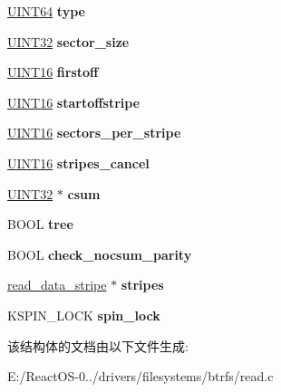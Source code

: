 \begin{DoxyCompactItemize}
\hyperlink{_processor_bind_8h_a57be03562867144161c1bfee95ca8f7c}{U\+I\+N\+T64} {\bfseries type}
\item 
\mbox{\label{structread__data__context_aa83ba8d116f7b629c0d7e2a3486686b2}} 
\hyperlink{_processor_bind_8h_ae1e6edbbc26d6fbc71a90190d0266018}{U\+I\+N\+T32} {\bfseries sector\+\_\+size}
\item 
\mbox{\label{structread__data__context_a37b33d582a6fac10de403aec1e0d6d1f}} 
\hyperlink{_processor_bind_8h_a09f1a1fb2293e33483cc8d44aefb1eb1}{U\+I\+N\+T16} {\bfseries firstoff}
\item 
\mbox{\label{structread__data__context_a123c14084338a843c1af8e095d17bc2d}} 
\hyperlink{_processor_bind_8h_a09f1a1fb2293e33483cc8d44aefb1eb1}{U\+I\+N\+T16} {\bfseries startoffstripe}
\item 
\mbox{\label{structread__data__context_a438c0d4dacb35212eb5a5b2231d89cc1}} 
\hyperlink{_processor_bind_8h_a09f1a1fb2293e33483cc8d44aefb1eb1}{U\+I\+N\+T16} {\bfseries sectors\+\_\+per\+\_\+stripe}
\item 
\mbox{\label{structread__data__context_a21e167966233b5ff4b4fac193278bb13}} 
\hyperlink{_processor_bind_8h_a09f1a1fb2293e33483cc8d44aefb1eb1}{U\+I\+N\+T16} {\bfseries stripes\+\_\+cancel}
\item 
\mbox{\label{structread__data__context_a5e3bb17f88b00e7807e38b3806773a0f}} 
\hyperlink{_processor_bind_8h_ae1e6edbbc26d6fbc71a90190d0266018}{U\+I\+N\+T32} $\ast$ {\bfseries csum}
\item 
\mbox{\label{structread__data__context_a790b138f5c66d05259932416d83bef4b}} 
B\+O\+OL {\bfseries tree}
\item 
\mbox{\label{structread__data__context_acdeda580db04622f71812ae9ca6a1d34}} 
B\+O\+OL {\bfseries check\+\_\+nocsum\+\_\+parity}
\item 
\mbox{\label{structread__data__context_a78ddacf7f6cfa667b363fc31f0e531c5}} 
\hyperlink{structread__data__stripe}{read\+\_\+data\+\_\+stripe} $\ast$ {\bfseries stripes}
\item 
\mbox{\label{structread__data__context_a75186a6a72efa2ff7ef96669623c05c8}} 
K\+S\+P\+I\+N\+\_\+\+L\+O\+CK {\bfseries spin\+\_\+lock}
\end{DoxyCompactItemize}


该结构体的文档由以下文件生成\+:\begin{DoxyCompactItemize}
\item 
E\+:/\+React\+O\+S-\/0../drivers/filesystems/btrfs/read.\+c\end{DoxyCompactItemize}
